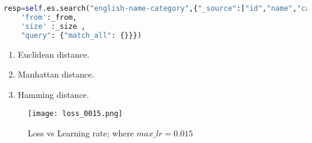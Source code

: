 \begin{lstlisting}[language=Python]
    resp=self.es.search("english-name-category",{"_source":["id","name","category"],
    'from':_from,
    'size' :_size ,
    "query": {"match_all": {}}})
\end{lstlisting}


\begin{enumerate}
    \item Euclidean distance.
    \item Manhattan distance.
    \item Hamming distance.
\end{enumerate}


\begin{figure}
    \centering    
    \texttt{[image: loss\_0015.png]}
    \caption{Loss vs Learning rate; where $max\_lr = 0.015$}
    \label{fig:Loss value at 0.015}
\end{figure}